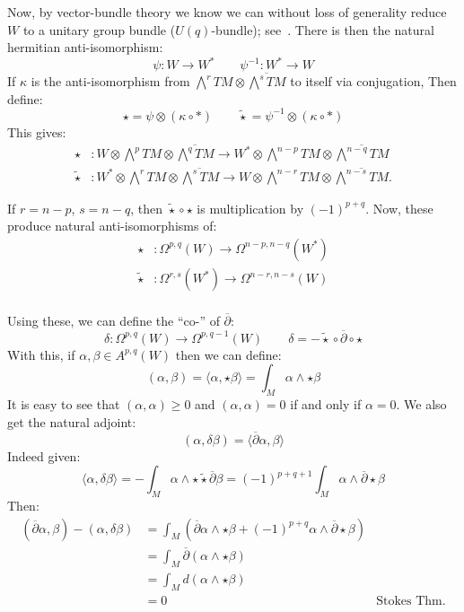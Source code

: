 \documentclass{ut-thesis}
\begin{document}
Now, by vector-bundle theory we know we can without loss of generality reduce $W$ to a unitary group bundle
($U(q)$-bundle); see~\cite{NateKTheory}. There is then the natural hermitian anti-isomorphism:
\[
  \psi: W \to W^* \qquad \psi^{-1}: W^* \to W
\]
If $\kappa$ is the anti-isomorphism from $\bigwedge^r TM \otimes \overline{\bigwedge^s TM}$ to itself via
conjugation, Then define:
\[
  \star = \psi \otimes (\kappa \circ *) \qquad \widetilde{\star} = \psi^{-1} \otimes (\kappa \circ *)
\]
This gives:
\begin{align*}
\star &: W \otimes \bigwedge^p TM \otimes \overline{\bigwedge^q TM} \to W^* \otimes \bigwedge^{n-p} TM \otimes \overline{\bigwedge^{n-q} TM} \\
\widetilde{\star} &: W^* \otimes \bigwedge^r TM \otimes \overline{\bigwedge^s TM} \to W \otimes \bigwedge^{n-r} TM \otimes \overline{\bigwedge^{n-s} TM}.
\end{align*}

If $r = n-p$, $s = n-q$, then $\widetilde{\star}\circ \star$ is multiplication by $(-1)^{p+q}$. Now, these
produce natural anti-isomorphisms of:
\begin{align*}
  \star&: \Omega^{p,q}(W) \to \Omega^{n-p, n-q}(W^*)\\
  \widetilde{\star}&: \Omega^{r,s}(W^*) \to \Omega^{n-r, n-s}(W)\\
\end{align*}

Using these, we can define the ``co-'' of $\overline{\partial}$:
\[
  \delta: \Omega^{p,q}(W) \to \Omega^{p, q-1}(W) \qquad \delta= -\widetilde{\star} \circ
  \overline{\partial} \circ \star
\]
With this, if $\alpha,\beta \in A^{p,q}(W)$ then we can define:
\[
  \left( \alpha,\beta \right) = \langle \alpha, \star \beta \rangle = \int_M \alpha \wedge  \star \beta
\]
It is easy to see that $\left( \alpha,\alpha \right) \ge 0$ and $\left(\alpha,\alpha  \right) = 0$ if and only
if $\alpha = 0$. We also get the natural adjoint:
\[
  \left(\alpha, \delta \beta\right) = \langle \overline{\partial}\alpha, \beta \rangle
\]
Indeed given:
\[
  \langle\alpha, \delta \beta\rangle = - \int_M \alpha \wedge  \star \widetilde{\star}\overline{\partial} \beta = (-1)^{p+q+1} \int_M \alpha \wedge \overline{\partial} \star \beta
\]
Then:
\begin{align*}
    (\overline{\partial}\alpha, \beta) - (\alpha, \delta \beta) &= \int_M (\overline{\partial}\alpha \wedge \star \beta + (-1)^{p+q} \alpha \wedge \overline{\partial} \star \beta) \\
    &= \int_M \overline{\partial}(\alpha \wedge \star \beta) \\
    &= \int_M d(\alpha \wedge \star \beta) \\
    &= 0 & \text{Stokes Thm.}
\end{align*}
\end{document}
